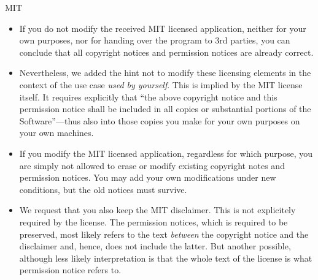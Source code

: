 \begin{license}{MIT}
\begin{itemize}
  \item If you do not modify the received MIT licensed application, neither for
    your own purposes, nor for handing over the program to 3rd parties, you can 
    conclude that all copyright notices and permission notices are already
    correct.
  \item Nevertheless, we added the hint not to modify these licensing elements
    in the context of the use case \emph{used by yourself}. This is implied by
    the MIT license itself. It requires explicitly that \enquote{the above
      copyright notice and this permission notice shall be included in all
      copies or substantial portions of the Software}\citeMIT---thus also into
    those copies you make for your own purposes on your own machines. 
  \item If you modify the MIT licensed application, regardless for which
    purpose, you are simply not allowed to erase or modify existing copyright
    notes and permission notices. You may add your own modifications under new
    conditions, but the old notices must survive. 
  \item We request that you also keep the MIT disclaimer. This is not
    explicitely required by the license. The permission notices, which is
    required to be preserved, most likely refers to the text \emph{between} the
    copyright notice and the disclaimer and, hence, does not include the latter.
    But another possible, although less likely interpretation is that the whole
    text of the license is what permission notice refers to.  
\end{itemize}

\end{license}

%

